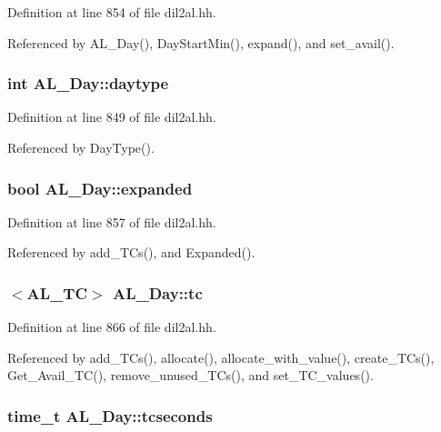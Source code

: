 Definition at line 854 of file dil2al.hh.

Referenced by AL\_\-Day(), Day\-Start\-Min(), expand(), and set\_\-avail().
\subsubsection{\setlength{\rightskip}{0pt plus 5cm}int AL\_\-Day::daytype\hspace{0.3cm}{\tt  [protected]}}\label{classAL__Day_n0}




Definition at line 849 of file dil2al.hh.

Referenced by Day\-Type().
\subsubsection{\setlength{\rightskip}{0pt plus 5cm}bool AL\_\-Day::expanded\hspace{0.3cm}{\tt  [protected]}}\label{classAL__Day_n8}




Definition at line 857 of file dil2al.hh.

Referenced by add\_\-TCs(), and Expanded().
\subsubsection{$<${\bf AL\_\-TC}$>$ AL\_\-Day::tc}\label{classAL__Day_m0}




Definition at line 866 of file dil2al.hh.

Referenced by add\_\-TCs(), allocate(), allocate\_\-with\_\-value(), create\_\-TCs(), Get\_\-Avail\_\-TC(), remove\_\-unused\_\-TCs(), and set\_\-TC\_\-values().
\subsubsection{\setlength{\rightskip}{0pt plus 5cm}time\_\-t AL\_\-Day::tcseconds\hspace{0.3cm}{\tt  [protected]}}\label{classAL__Day_n7}




